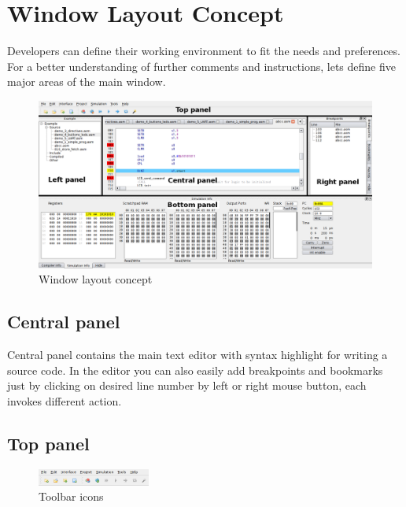 \section{Window Layout Concept}
    Developers can define their working environment to fit the needs and preferences. For a better understanding of
    further comments and instructions, lets define five major areas of the main window.

   \begin{figure}[h]
        \centering
        \includegraphics[width=\textwidth]{img/Main_window.png}
        \caption{Window layout concept}
    \end{figure}

    \subsection{Central panel}
        Central panel contains the main text editor with syntax highlight for writing a source code. In the editor you can
        also easily add breakpoints and bookmarks just by clicking on desired line number by left or right mouse button,
        each invokes different action.

    \subsection{Top panel}
    \begin{figure}[h!]
            \centering
            \includegraphics[width=0.33\textwidth]{img/top_panel.png}
            \caption{Toolbar icons}
        \end{figure}

